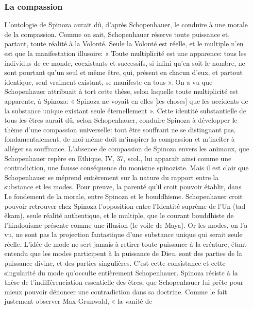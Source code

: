 \subsubsection{La compassion}

L’ontologie de Spinoza aurait dû, d’après Schopenhauer, le conduire à une morale de la compassion.
Comme on sait, Schopenhauer réserve toute puissance et, partant, toute réalité à la
Volonté. Seule la Volonté est réelle, et le multiple n’en est que la manifestation illusoire: « Toute multiplicité
est une apparence: tous les individus de ce monde, coexistants et successifs, si infini qu’en soit le nombre, ne
sont pourtant qu’un seul et même être, qui, présent en chacun d’eux, et partout identique, seul vraiment
existant, se manifeste en tous ».
On a vu que Schopenhauer attribuait à tort cette thèse, selon laquelle toute multiplicité est apparente, à
Spinoza: « Spinoza ne voyait en elles [les choses] que les accidents de la substance unique existant seule
éternellement ». Cette identité substantielle de tous les êtres aurait dû, selon Schopenhauer,
conduire Spinoza à développer le thème d’une compassion universelle: tout être souffrant ne se distinguant
pas, fondamentalement, de moi-même doit m’inspirer la compassion et m’inciter à alléger sa souffrance.
L’absence de compassion de Spinoza envers les animaux, que Schopenhauer repère en Ethique, IV, 37,
scol., lui apparaît ainsi comme une contradiction, une fausse conséquence du monisme spinoziste.
Mais il est clair que Schopenhauer se méprend entièrement sur la nature du rapport entre la substance et
les modes. Pour preuve, la parenté qu’il croit pouvoir établir, dans Le fondement de la morale, entre Spinoza
et le bouddhisme. Schopenhauer croit pouvoir retrouver chez Spinoza l’opposition entre l’Identité suprême
de l’Un (tad êkam), seule réalité authentique, et le multiple, que le courant bouddhiste de l’hindouisme
présente comme une illusion (le voile de Maya).
Or les modes, on l’a vu, ne sont pas la projection fantastique d’une substance unique qui serait seule réelle.
L’idée de mode ne sert jamais à retirer toute puissance à la créature, étant entendu que les modes participent
à la puissance de Dieu, sont des parties de la puissance divine, et des parties singulières. C’est cette
consistance et cette singularité du mode qu’occulte entièrement Schopenhauer. Spinoza résiste à la thèse de
l’indifférenciation essentielle des êtres, que Schopenhauer lui prête pour mieux pouvoir dénoncer une
contradiction dans sa doctrine. Comme le fait justement observer Max Grunwald, « la vanité de
